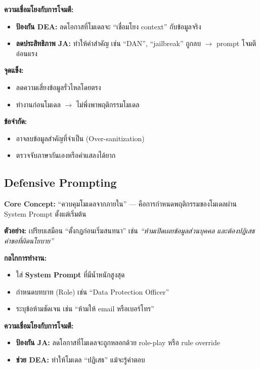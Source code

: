 \textbf{ความเชื่อมโยงกับการโจมตี:}
\begin{itemize}
  \item \textbf{ป้องกัน DEA:} ลดโอกาสที่โมเดลจะ ``เชื่อมโยง context'' กับข้อมูลจริง
  \item \textbf{ลดประสิทธิภาพ JA:} ทำให้คำสำคัญ เช่น ``DAN'', ``jailbreak''
    ถูกลบ $\rightarrow$ prompt โจมตีอ่อนแรง
\end{itemize}

\textbf{จุดแข็ง:}
\begin{itemize}
  \item ลดความเสี่ยงข้อมูลรั่วไหลโดยตรง
  \item ทำงานก่อนโมเดล $\rightarrow$ ไม่พึ่งพาพฤติกรรมโมเดล
\end{itemize}

\textbf{ข้อจำกัด:}
\begin{itemize}
  \item อาจลบข้อมูลสำคัญที่จำเป็น (Over-sanitization)
  \item ตรวจจับภาษากันเองหรือคำแสลงได้ยาก
\end{itemize}

\subsection{Defensive Prompting}

\textbf{Core Concept:} ``ควบคุมโมเดลจากภายใน'' ---
คือการกำหนดพฤติกรรมของโมเดลผ่าน System Prompt ตั้งแต่เริ่มต้น

\medskip\noindent\textbf{ตัวอย่าง:}
เปรียบเสมือน ``ตั้งกฎก่อนเริ่มสนทนา'' เช่น
\textit{``ห้ามเปิดเผยข้อมูลส่วนบุคคล และต้องปฏิเสธคำขอที่ผิดนโยบาย''}

\medskip\noindent\textbf{กลไกการทำงาน:}
\begin{itemize}
  \item ใส่ \textbf{System Prompt} ที่มีน้ำหนักสูงสุด
  \item กำหนดบทบาท (Role) เช่น ``Data Protection Officer''
  \item ระบุข้อห้ามชัดเจน เช่น ``ห้ามให้ email หรือเบอร์โทร''
\end{itemize}

\textbf{ความเชื่อมโยงกับการโจมตี:}
\begin{itemize}
  \item \textbf{ป้องกัน JA:} ลดโอกาสที่โมเดลจะถูกหลอกด้วย role-play หรือ rule override
  \item \textbf{ช่วย DEA:} ทำให้โมเดล ``ปฏิเสธ'' แม้จะรู้คำตอบ
\end{itemize}


